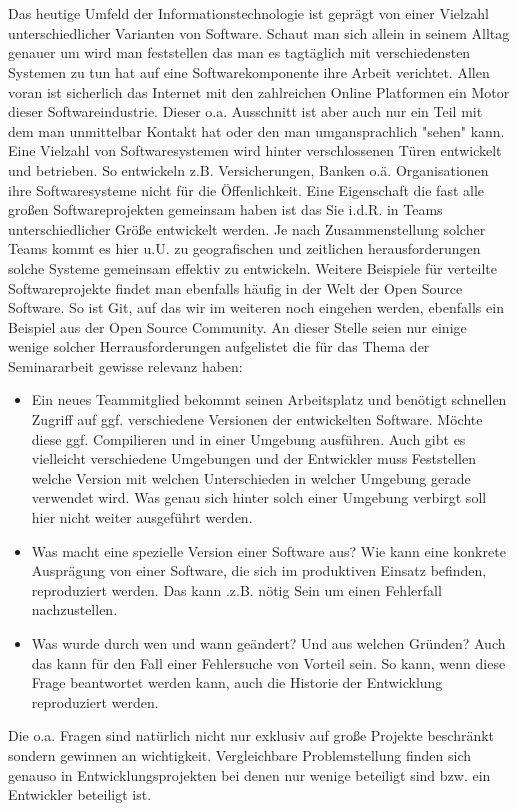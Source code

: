 \chapter{\preamble}
\label{cha:preamble}
Das heutige Umfeld der Informationstechnologie ist gepr\"agt von einer Vielzahl
unterschiedlicher Varianten von Software. Schaut man sich allein in seinem
Alltag genauer um wird man feststellen das man es tagt\"aglich mit
verschiedensten Systemen zu tun hat auf eine Softwarekomponente ihre Arbeit
verichtet. Allen voran ist sicherlich das Internet mit den zahlreichen Online
Platformen ein Motor dieser Softwareindustrie. Dieser o.a. Ausschnitt ist aber
auch nur ein Teil mit dem man unmittelbar Kontakt hat oder den man
umgansprachlich "sehen" kann.  Eine Vielzahl von Softwaresystemen wird hinter
verschlossenen T\"uren entwickelt und betrieben. So entwickeln z.B.
Versicherungen, Banken o.\"a. Organisationen ihre Softwaresysteme nicht f\"ur die
\"Offenlichkeit. Eine Eigenschaft die fast alle gro\ss{}en Softwareprojekten
gemeinsam haben ist das Sie i.d.R. in Teams unterschiedlicher Gr\"o\ss{}e entwickelt
werden. Je nach Zusammenstellung solcher Teams kommt es hier u.U. zu
geografischen und zeitlichen herausforderungen solche Systeme gemeinsam
effektiv zu entwickeln. Weitere Beispiele f\"ur verteilte Softwareprojekte findet
man ebenfalls h\"aufig in der Welt der Open Source Software. So ist Git, auf das
wir im weiteren noch eingehen werden, ebenfalls ein Beispiel aus der Open
Source Community. An dieser Stelle seien nur einige wenige solcher Herrausforderungen
aufgelistet die f\"ur das Thema der Seminararbeit gewisse relevanz haben:
\begin{itemize}
\item Ein neues Teammitglied bekommt seinen Arbeitsplatz und ben\"otigt
schnellen Zugriff auf ggf. verschiedene Versionen der entwickelten Software.
M\"ochte diese ggf. Compilieren und in einer Umgebung ausf\"uhren. Auch gibt es
vielleicht verschiedene Umgebungen und der Entwickler muss Feststellen welche
Version mit welchen Unterschieden in welcher Umgebung gerade verwendet wird.
Was genau sich hinter solch einer Umgebung verbirgt soll hier nicht weiter
ausgef\"uhrt werden\citep[p.~66]{cd}.
\item Was macht eine spezielle Version einer Software aus? Wie kann eine
konkrete Auspr\"agung von einer Software, die sich im produktiven Einsatz
befinden, reproduziert werden. Das kann .z.B. n\"otig Sein um einen Fehlerfall
nachzustellen\cite[p.~66]{cd}.
\item Was wurde durch wen und wann ge\"andert? Und aus welchen Gr\"unden? Auch das
kann f\"ur den Fall einer Fehlersuche von Vorteil sein. So kann, wenn diese Frage
beantwortet werden kann, auch die Historie der Entwicklung reproduziert werden\cite[p.~t66]{cd}.
\end{itemize}
Die o.a. Fragen sind natürlich nicht nur exklusiv auf große Projekte beschränkt
sondern gewinnen an wichtigkeit. Vergleichbare Problemstellung finden sich
genauso in Entwicklungsprojekten bei denen nur wenige beteiligt sind bzw. ein
Entwickler beteiligt ist.
